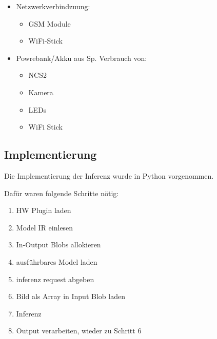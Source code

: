 

\begin{itemize}
    \item Netzwerkverbindzuung:
    \begin{itemize}
        \item GSM Module
        \item WiFi-Stick
    \end{itemize}
    \item Powrebank/Akku aus Sp. Verbrauch von:
    \begin{itemize}
        \item NCS2
        \item Kamera
        \item LEDs
        \item WiFi Stick
    \end{itemize}
\end{itemize}









\subsection*{Implementierung}

Die Implementierung der Inferenz wurde in Python vorgenommen. 

Dafür waren folgende Schritte nötig:

 
\begin{enumerate}
    \item HW Plugin laden
    \item Model IR einlesen
    \item In-Output Blobs allokieren 
    \item ausführbares Model laden
    \item inferenz request abgeben
    \item Bild als Array in Input Blob laden
    \item Inferenz
    \item Output verarbeiten, wieder zu Schritt 6
\end{enumerate}


